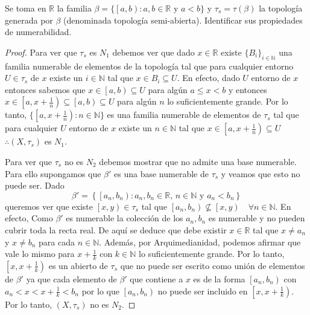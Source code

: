 \documentclass{article}
\theoremstyle{definition}
\newcommand{\R}{\mathbb{R}}
\newcommand{\N}{\mathbb{N}}
\newcommand{\coint}[2]{\left[ #1, #2 \right)}
\newenvironment{ejercicio}[1]{\begin{trivlist}
\item[\hskip \labelsep {\bfseries Ejercicio}\hskip \labelsep {\bfseries #1.}]}{\end{trivlist}}
\begin{document}
\begin{ejercicio}{8}
    Se toma en \(\mathbb{R}\) la familia \( \beta = \{ \coint{a}{b} : a, b \in \mathbb{R} \text{ y } a<b\} \) y \(\tau_{s}=\tau(\beta)\) la topología generada por \( \beta \) (denominada topología semi-abierta).
    Identificar sus propiedades de numerabilidad.
\end{ejercicio}
\begin{proof}
    Para ver que \( \tau_s \) es \( N_1 \) debemos ver que dado \( x \in \R \) existe \( {\{ B_i \}}_{i \in \N} \) una familia numerable
    de elementos de la topología tal que para cualquier entorno \( U \in \tau_s \) de \( x \) existe un \( i \in \N \) tal que \( x \in B_i \subseteq U \).
    En efecto, dado \( U \) entorno de \( x \) entonces sabemos que \( x \in \coint{a}{b} \subseteq U \) para algún \( a \leq x < b \) y entonces \( x \in \coint{a}{x+\frac{1}{n}} \subseteq \coint{a}{b} \subseteq U \) para algún \( n \) lo suficientemente grande.
    Por lo tanto, \( \{ \coint{a}{x+\frac{1}{n}} : n \in \N \} \) es una familia numerable de elementos de \( \tau_s \) tal que para cualquier \( U \) entorno de \( x \) existe un \( n \in \N \) tal que \( x \in \coint{a}{x+\frac{1}{n}} \subseteq U \)
    \( \therefore (X, \tau_s) \) es \( N_1 \).

    Para ver que \( \tau_s \) no es \( N_2 \) debemos mostrar que no admite una base numerable. Para ello supongamos que \( \beta' \) es una base numerable de \( \tau_s \) y veamos que esto no puede ser.
    Dado \[
        \beta' = \left \{ \coint{a_n}{b_n} : a_n, b_n \in \R, \, n \in \N \text{ y } a_n < b_n \right \}
    \] queremos ver que existe \( \coint{x}{y} \in \tau_s \) tal que \( \coint{a_n}{b_n} \nsubseteq \coint{x}{y} \quad \forall n \in \N \). En efecto,
    Como \( \beta' \) es numerable la colección de los \( a_n, b_n \) es numerable y no pueden cubrir toda la recta real. De aquí se deduce que debe existir \( x \in \R \) tal que \( x \neq a_n \)
    y \( x \neq b_n \) para cada \( n \in \N \). Además, por Arquimedianidad, podemos afirmar que vale lo mismo para \( x + \frac{1}{k} \) con \( k \in \N \) lo suficientemente grande.
    Por lo tanto, \( \coint{x}{x+\frac{1}{k}} \) es un abierto de \( \tau_s \) que no puede ser escrito como unión de elementos de \( \beta' \) ya que cada elemento de \( \beta' \)
    que contiene a \( x \) es de la forma \( \coint{a_n}{b_n} \) con \( a_n < x < x+\frac{1}{k} < b_n \) por lo que \( \coint{a_n}{b_n} \) no puede ser incluido en \( \coint{x}{x+\frac{1}{k}} \). Por lo tanto, \( (X, \tau_s) \) no es \( N_2 \).


\end{proof}
\end{document}
